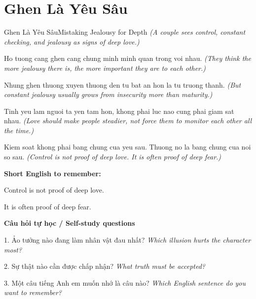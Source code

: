 \section{Ghen Là Yêu Sâu}
\begin{truyen}{Ghen Là Yêu Sâu}{Mistaking Jealousy for Depth}
\textit{(A couple sees control, constant checking, and jealousy as signs of deep love.)}

Ho tuong cang ghen cang chung minh minh quan trong voi nhau.
\textit{(They think the more jealousy there is, the more important they are to each other.)}

Nhung ghen thuong xuyen thuong den tu bat an hon la tu truong thanh.
\textit{(But constant jealousy usually grows from insecurity more than maturity.)}

Tinh yeu lam nguoi ta yen tam hon, khong phai luc nao cung phai giam sat nhau.
\textit{(Love should make people steadier, not force them to monitor each other all the time.)}

\end{truyen}

\begin{baihoc}
Kiem soat khong phai bang chung cua yeu sau. Thuong no la bang chung cua noi so sau.
\textit{(Control is not proof of deep love. It is often proof of deep fear.)}
\end{baihoc}

\begin{ghinhoanh}
\textbf{Short English to remember:}

Control is not proof of deep love.

It is often proof of deep fear.

\end{ghinhoanh}

\begin{tuhocnhanh}
\textbf{Câu hỏi tự học / Self-study questions}

1. Ảo tưởng nào đang làm nhân vật đau nhất? \textit{Which illusion hurts the character most?}

2. Sự thật nào cần được chấp nhận? \textit{What truth must be accepted?}

3. Một câu tiếng Anh em muốn nhớ là câu nào? \textit{Which English sentence do you want to remember?}
\end{tuhocnhanh}
\ngancach


